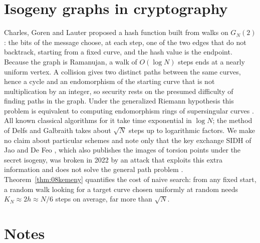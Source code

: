 \section{Isogeny graphs in cryptography}

Charles, Goren and Lauter \cite{cgl2009} proposed a hash function built from walks on $G_N(2)$: the bits of the message choose, at each step, one of the two edges that do not backtrack, starting from a fixed curve, and the hash value is the endpoint. Because the graph is Ramanujan, a walk of $O(\log N)$ steps ends at a nearly uniform vertex. A collision gives two distinct paths between the same curves, hence a cycle and an endomorphism of the starting curve that is not multiplication by an integer, so security rests on the presumed difficulty of finding paths in the graph. Under the generalized Riemann hypothesis this problem is equivalent to computing endomorphism rings of supersingular curves \cite{wesolowski2022}. All known classical algorithms for it take time exponential in $\log N$; the method of Delfs and Galbraith \cite{delfsgalbraith2016} takes about $\sqrt N$ steps up to logarithmic factors. We make no claim about particular schemes and note only that the key exchange SIDH of Jao and De Feo \cite{jaodefeo2011}, which also publishes the images of torsion points under the secret isogeny, was broken in 2022 by an attack that exploits this extra information and does not solve the general path problem \cite{castryckdecru2023}. Theorem~\ref{thm:08kemeny} quantifies the cost of naive search: from any fixed start, a random walk looking for a target curve chosen uniformly at random needs $K_N\approx2h\approx N/6$ steps on average, far more than $\sqrt N$.

\section{Notes}


